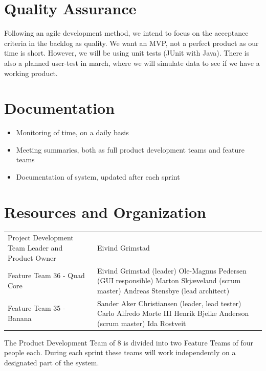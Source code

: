 \documentclass[a4paper,12pt]{article}
\begin{document}
\section{Quality Assurance}
Following an agile development method, we intend to focus on the acceptance criteria in the backlog as quality. We want an MVP, not a perfect product as our time is short. However, we will be using unit tests (JUnit with Java). 
There is also a planned user-test in march, where we will simulate data to see if we have a working product.

\section{Documentation}
\begin{itemize}
	\item Monitoring of time, on a daily basis
	\item Meeting summaries, both as full product development teams and feature teams
	\item Documentation of system, updated after each sprint
\end{itemize}

\section{Resources and Organization}
\begin{tabularx}{\textwidth}{p{}p{}}
	Project Development Team Leader and Product Owner & Eivind Grimstad \\
	Feature Team 36 - Quad Core & 
		Eivind Grimstad (leader)\newline
		Ole-Magnus Pedersen (GUI responsible)\newline
		Marton Skjæveland (scrum master)\newline
		Andreas Stensbye (lead architect)\newline
		\\
	Feature Team 35 - Banana & 
		Sander Aker Christiansen (leader, lead tester)\newline
		Carlo Alfredo Morte III\newline
		Henrik Bjelke Anderson (scrum master)\newline
		Ida Rostveit
\end{tabularx}
\newline
\vspace{10px}

The Product Development Team of 8 is divided into two Feature Teams of four people each. During each sprint these teams will work independently on a designated part of the system.
\end{document}
